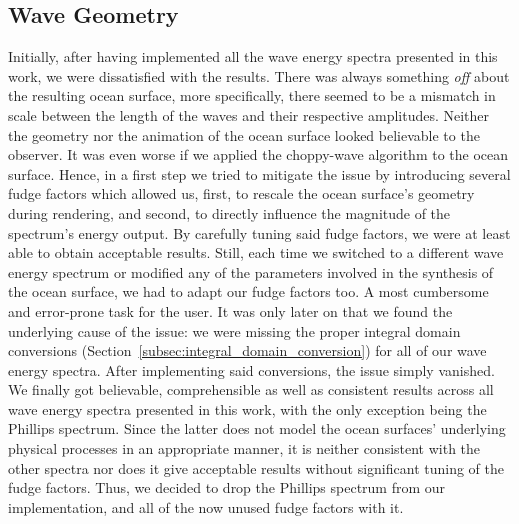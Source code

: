 \subsection{Wave Geometry}
Initially, after having implemented all the wave energy
spectra presented in this work, we were dissatisfied with the results.
There was always something \emph{off} about the resulting ocean surface, more
specifically, there seemed to be a mismatch in scale between the length of the
waves and their respective amplitudes. Neither the geometry nor the animation of
the ocean surface looked believable to the observer. It was even worse if we
applied the choppy-wave algorithm to the ocean surface. Hence, in a first step we
tried to mitigate the issue by introducing several fudge factors which allowed
us, first, to rescale the ocean surface's geometry during rendering, and second,
to directly influence the magnitude of the spectrum's energy output. 
By carefully tuning said fudge factors, we were at least able to obtain
acceptable results. Still, each time we switched to a different wave energy
spectrum or modified any of the parameters involved
in the synthesis of the ocean surface, we had to adapt our fudge factors too.
A most cumbersome and error-prone task for the user.
It was only later on that we found the underlying cause of the issue:
we were missing the proper integral domain conversions \textcolor{changed}{(Section~\ref{subsec:integral_domain_conversion})} for all of our wave energy
spectra. %
After implementing said conversions, the issue simply vanished.
We finally got believable, comprehensible as well as consistent results across
all wave energy spectra presented in this work, with the only exception being
the Phillips spectrum. Since the latter does not model the ocean surfaces'
underlying physical processes in an appropriate manner, it
is neither consistent with the other spectra nor does it give acceptable
results without significant tuning of the fudge factors. Thus, we decided to
drop the Phillips spectrum from our implementation, and all of the now unused
fudge factors with it.
%
